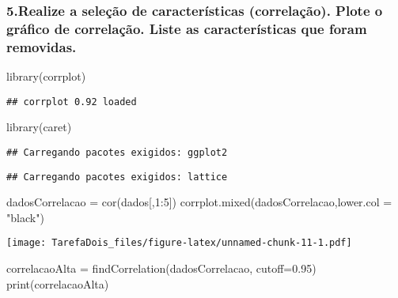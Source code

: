 \documentclass[
]{article}
\newenvironment{Shaded}{\begin{snugshade}}{\end{snugshade}}
\newcommand{\AttributeTok}[1]{\textcolor[rgb]{0.77,0.63,0.00}{#1}}
\newcommand{\DecValTok}[1]{\textcolor[rgb]{0.00,0.00,0.81}{#1}}
\newcommand{\FloatTok}[1]{\textcolor[rgb]{0.00,0.00,0.81}{#1}}
\newcommand{\FunctionTok}[1]{\textcolor[rgb]{0.00,0.00,0.00}{#1}}
\newcommand{\NormalTok}[1]{#1}
\newcommand{\OtherTok}[1]{\textcolor[rgb]{0.56,0.35,0.01}{#1}}
\newcommand{\SpecialCharTok}[1]{\textcolor[rgb]{0.00,0.00,0.00}{#1}}
\newcommand{\StringTok}[1]{\textcolor[rgb]{0.31,0.60,0.02}{#1}}
\begin{document}
\hypertarget{realize-a-seleuxe7uxe3o-de-caracteruxedsticas-correlauxe7uxe3o.-plote-o-gruxe1fico-de-correlauxe7uxe3o.-liste-as-caracteruxedsticas-que-foram-removidas.}{%
\subsubsection{5.Realize a seleção de características (correlação).
Plote o gráfico de correlação. Liste as características que foram
removidas.}\label{realize-a-seleuxe7uxe3o-de-caracteruxedsticas-correlauxe7uxe3o.-plote-o-gruxe1fico-de-correlauxe7uxe3o.-liste-as-caracteruxedsticas-que-foram-removidas.}}

\begin{Shaded}
\begin{Highlighting}[]
\FunctionTok{library}\NormalTok{(corrplot)}
\end{Highlighting}
\end{Shaded}

\begin{verbatim}
## corrplot 0.92 loaded
\end{verbatim}

\begin{Shaded}
\begin{Highlighting}[]
\FunctionTok{library}\NormalTok{(caret)}
\end{Highlighting}
\end{Shaded}

\begin{verbatim}
## Carregando pacotes exigidos: ggplot2
\end{verbatim}

\begin{verbatim}
## Carregando pacotes exigidos: lattice
\end{verbatim}

\begin{Shaded}
\begin{Highlighting}[]
\NormalTok{dadosCorrelacao }\OtherTok{=} \FunctionTok{cor}\NormalTok{(dados[,}\DecValTok{1}\SpecialCharTok{:}\DecValTok{5}\NormalTok{])}
\FunctionTok{corrplot.mixed}\NormalTok{(dadosCorrelacao,}\AttributeTok{lower.col =} \StringTok{"black"}\NormalTok{)}
\end{Highlighting}
\end{Shaded}

\texttt{[image: TarefaDois\_files/figure-latex/unnamed-chunk-11-1.pdf]}

\begin{Shaded}
\begin{Highlighting}[]
\NormalTok{correlacaoAlta }\OtherTok{=} \FunctionTok{findCorrelation}\NormalTok{(dadosCorrelacao, }\AttributeTok{cutoff=}\FloatTok{0.95}\NormalTok{)}
\FunctionTok{print}\NormalTok{(correlacaoAlta)}
\end{Highlighting}
\end{Shaded}
\end{document}
